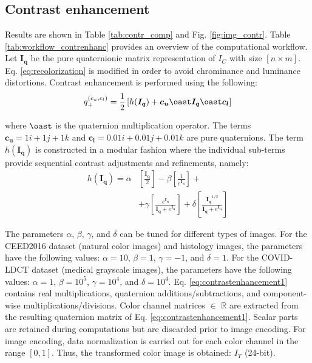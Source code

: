 \documentclass[superscriptaddress,longbibliography,aps,prl,twocolumn,10pt]{revtex4-2}
\begin{document}
\subsection*{\normalsize{Contrast enhancement}}
Results are shown in Table \ref{tab:contr_comp} and Fig. \ref{fig:img_contr}. Table \ref{tab:workflow_contrenhanc} provides an overview of the computational workflow. Let $\boldsymbol{I_{q}}$ be the pure quaternionic matrix representation of $I_C$ with size $[n \times m]$. Eq. \ref{eq:recolorization} is modified in order to avoid chrominance and luminance distortions. Contrast enhancement is performed using the following:
    \begin{equation} \label{eq:contrastenhancement1}
        q_{+}^{\left(c_{u},c_{l}\right)} = \frac{1}{2} \left[h(\boldsymbol{I_{q}}) + \boldsymbol{c_{u}} \oast \boldsymbol{I_{q}} \oast \boldsymbol{c_{l}} \right]
    \end{equation}

\noindent
where $\oast$ is the quaternion multiplication operator. The terms $\mathbf{c_{u}} = 1i + 1j + 1k$ and $\mathbf{c_{l}} = 0.01i + 0.01j + 0.01k$ are pure quaternions. The term $h(\boldsymbol{I_{q}})$ is constructed in a modular fashion where the individual sub-terms provide sequential contrast adjustments and refinements, namely: 
    \begin{equation} \label{eq:contrastenhancement2}
    \begin{aligned}
        h(\boldsymbol{I_q}) = \alpha &\left[ \frac{\boldsymbol{I_q}}{2} \right] - \beta \left[ \frac{1}{e^{ \boldsymbol{I_q}}} \right] + \\
        & +\gamma \left[ \frac{e^{ \boldsymbol{I_q}}}{ \boldsymbol{I_q} + e^{ \boldsymbol{I_q}}} \right] + \delta \left[ \frac{\boldsymbol{I_q}^{1/2}}{\boldsymbol{I_q} + e^{\boldsymbol{I_q}}} \right]
    \end{aligned}
    \end{equation}

\noindent
The parameters $\alpha$, $\beta$, $\gamma$, and $\delta$ can be tuned for different types of images. For the CEED2016 dataset \cite{Qureshi2016, Qureshi2017} (natural color images) and histology images, the parameters have the following values: $\alpha=10$, $\beta=1$, $\gamma=-1$, and $\delta=1$. For the COVID-LDCT dataset \cite{Afshar2021} (medical grayscale images), the parameters have the following values: $\alpha=1$, $\beta=10^5$, $\gamma=10^4$, and $\delta=10^4$. Eq. \ref{eq:contrastenhancement1} contains real multiplications, quaternion additions/subtractions, and component-wise multiplications/divisions. Color channel matrices $\in$ $\mathbb{R}$ are extracted from the resulting quaternion matrix of Eq. \ref{eq:contrastenhancement1}. Scalar parts are retained during computations but are discarded prior to image encoding. For image encoding, data normalization is carried out for each color channel in the range $[0,1]$. Thus, the transformed color image is obtained: $I_{T}$ (24-bit).
\end{document}
